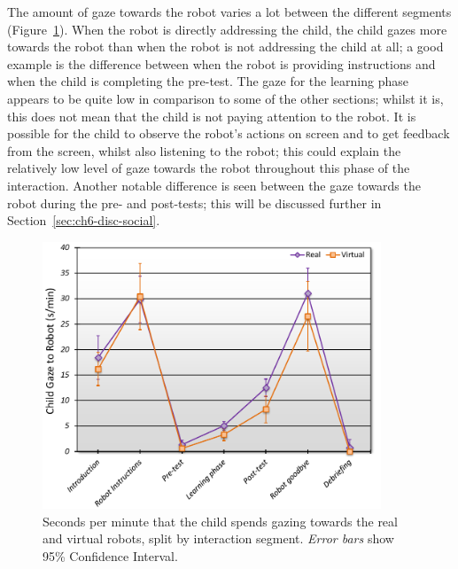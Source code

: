 The amount of gaze towards the robot varies a lot between the different segments (Figure~\ref{fig:ch6-gazesegments}). When the robot is directly addressing the child, the child gazes more towards the robot than when the robot is not addressing the child at all; a good example is the difference between when the robot is providing instructions and when the child is completing the pre-test. The gaze for the learning phase appears to be quite low in comparison to some of the other sections; whilst it is, this does not mean that the child is not paying attention to the robot. It is possible for the child to observe the robot's actions on screen and to get feedback from the screen, whilst also listening to the robot; this could explain the relatively low level of gaze towards the robot throughout this phase of the interaction. Another notable difference is seen between the gaze towards the robot during the pre- and post-tests; this will be discussed further in Section~\ref{sec:ch6-disc-social}.

\begin{figure}[t!]
    \centering
    \includegraphics[width=0.9\textwidth]{images/ch6_RvsVFull.pdf}
    \caption{Seconds per minute that the child spends gazing towards the real and virtual robots, split by interaction segment. \textit{Error bars} show 95\% Confidence Interval.}
    \label{fig:ch6-gazesegments}
\end{figure}

